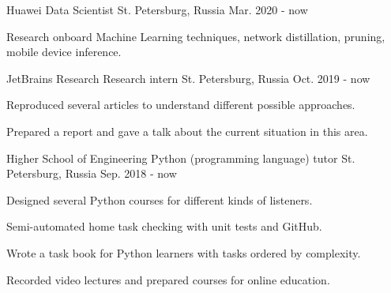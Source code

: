 

\begin{cventries}
	
\cventry
	{Huawei} %
	{Data Scientist} %
	{St. Petersburg, Russia} %
	{Mar. 2020 - now} %
	{
		\begin{cvitems} %
			\item {Research onboard Machine Learning techniques, network distillation, pruning, mobile device inference.}
		\end{cvitems}
	}
	
  \cventry
	{JetBrains Research} %
	{Research intern} %
	{St. Petersburg, Russia} %
	{Oct. 2019 - now} %
	{
		\begin{cvitems} %
			\item {Reproduced several articles to understand different possible approaches.}
			\item {Prepared a report and gave a talk about the current situation in this area.}
		\end{cvitems}
}

  \cventry
    {Higher School of Engineering} %
    {Python (programming language) tutor} %
    {St. Petersburg, Russia} %
    {Sep. 2018 - now} %
    {
		\begin{cvitems} %
		 \item {Designed several Python courses for different kinds of listeners.}
		 \item {Semi-automated home task checking with unit tests and GitHub.}
		 \item {Wrote a task book for Python learners with tasks ordered by complexity.}
		 \item {Recorded video lectures and prepared courses for online education.}
		\end{cvitems}
    }


\end{cventries}
